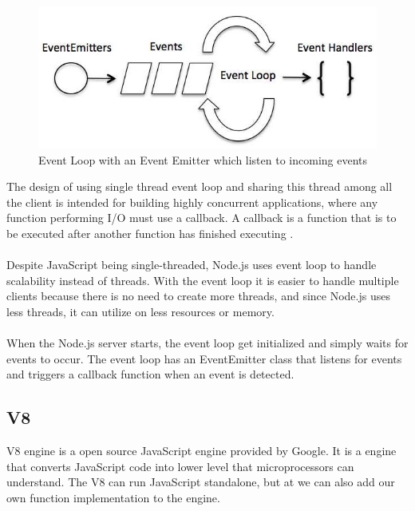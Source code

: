 \begin{figure}[h!]
  \centering
  \includegraphics[scale=0.5]{figs/event_loop.jpg}
  \caption{Event Loop with an Event Emitter which listen to incoming events \cite{eventloop:image}}
\end{figure}

The design of using single thread event loop and sharing this thread among all the client is intended for building highly concurrent applications, where any function performing I/O must use a callback. A callback is a function that is to be executed after another function has finished executing \cite{codeburst:callback}. 
\\\\
Despite JavaScript being single-threaded, Node.js uses event loop to handle scalability instead of threads. With the event loop it is easier to handle multiple clients because there is no need to create more threads, and since Node.js uses less threads, it can utilize on less resources or memory. 
\\\\
When the Node.js server starts, the event loop get initialized and simply waits for events to occur. The event loop has an EventEmitter class that listens for events and triggers a callback function when an event is detected. 

\subsection{V8}
V8 engine is a open source JavaScript engine provided by Google. It is a engine that converts JavaScript code into lower level that microprocessors can understand. The V8 can run JavaScript standalone, but at we can also add our own function implementation to the engine.

